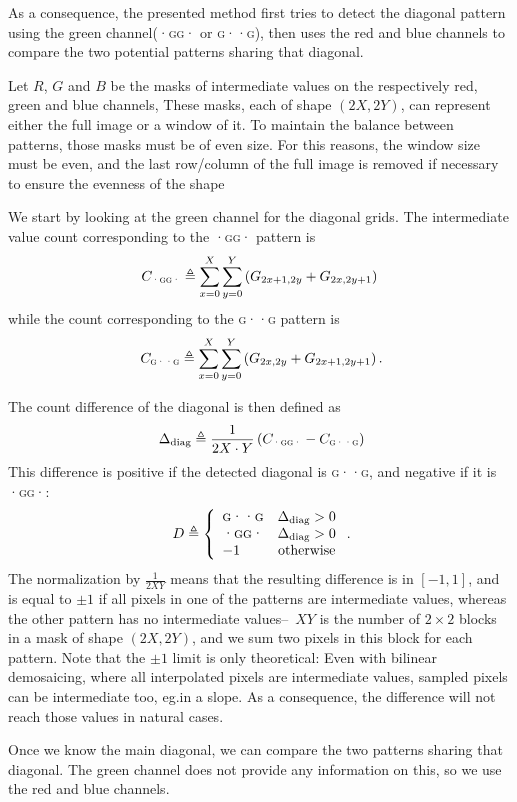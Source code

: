 \documentclass{ipol}
\begin{document}
As a consequence, the presented method first tries to detect the diagonal pattern using the green channel(\textsc{·gg·} or \textsc{g··g}), then uses the red and blue channels to compare the two potential patterns sharing that diagonal.

Let $R$, $G$ and $B$ be the masks of intermediate values on the respectively red, green and blue channels, These masks, each of shape $(2X, 2Y)$, can represent either the full image or a window of it. To maintain the balance between patterns, those masks must be of even size. For this reasons, the window size must be even, and the last row/column of the full image is removed if necessary to ensure the evenness of the shape

We start by looking at the green channel for the diagonal grids. The intermediate value count corresponding to the \textsc{·gg·} pattern is
\[C_{\textsc{·gg·}} \triangleq \sum_{x=0}^X\sum_{y=0}^Y\left(G_{2x+1, 2y} + G_{2x, 2y+1}\right)\]
while the count corresponding to the \textsc{g··g} pattern is
\[\phantom.C_{\textsc{g··g}} \triangleq \sum_{x=0}^X\sum_{y=0}^Y\left(G_{2x, 2y} + G_{2x+1, 2y+1}\right).\]

The count difference of the diagonal is then defined as
\[\phantom.\Delta_{\mathrm{diag}}  \triangleq \frac 1 {2X\cdot Y} \left(C_{\textsc{·gg·}} - C_{\textsc{g··g}}\right)\]
This difference is positive if the detected diagonal is \textsc{g··g}, and negative if it is \textsc{·gg·}:
\[\phantom.D\triangleq\left\{\begin{array}{lc}\textsc{g··g}&\Delta_{\mathrm{diag}}>0\\\textsc{·gg·}&\Delta_{\mathrm{diag}}>0\\-1&\text{otherwise}\end{array}\right..\]
        The normalization by $\frac{1}{2XY}$ means that the resulting difference is in $[-1, 1]$, and is equal to $\pm1$ if all pixels in one of the patterns are intermediate values, whereas the other pattern has no intermediate values--~$XY$ is the number of $2\times2$ blocks in a mask of shape $(2X, 2Y)$, and we sum two pixels in this block for each pattern. Note that the $\pm1$ limit is only theoretical: Even with bilinear demosaicing, where all interpolated pixels are intermediate values, sampled pixels can be intermediate too, eg.\@ in a slope. As a consequence, the difference will not reach those values in natural cases.

Once we know the main diagonal, we can compare the two patterns sharing that diagonal. The green channel does not provide any information on this, so we use the red and blue channels.
\end{document}
